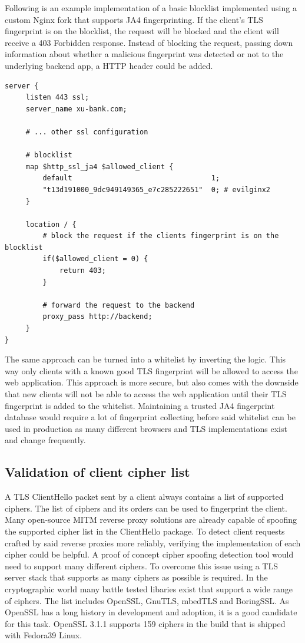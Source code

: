 \documentclass[12pt]{scrbook}
\begin{document}
Following is an example implementation of a basic blocklist implemented using a
custom Nginx
fork that supports JA4 fingerprinting. If the client's TLS fingerprint is on the
blocklist, the request will be blocked and the client will receive a 403
Forbidden response. Instead of blocking the request, passing down information
about whether a malicious fingerprint was detected or not to the underlying
backend app, a HTTP header could be added.

\begin{verbatim}
server {
     listen 443 ssl;
     server_name xu-bank.com;

     # ... other ssl configuration

     # blocklist
     map $http_ssl_ja4 $allowed_client {
         default                                 1;
         "t13d191000_9dc949149365_e7c285222651"  0; # evilginx2
     }

     location / {
         # block the request if the clients fingerprint is on the blocklist
         if($allowed_client = 0) {
             return 403;
         }

         # forward the request to the backend
         proxy_pass http://backend;
     }
}
\end{verbatim}

The same approach can be turned into a whitelist by inverting the logic. This
way only clients with a known good TLS fingerprint will be allowed to access the
web application. This approach is more secure, but also comes with the downside
that new clients will not be able to access the web application until their TLS
fingerprint is added to the whitelist. Maintaining a trusted JA4 fingerprint
database would require a lot of fingerprint collecting before said whitelist can
be used in production as many different browsers and TLS implementations exist
and change frequently.

\subsection{Validation of client cipher list} A TLS ClientHello packet sent
by a client always contains a list of supported ciphers. The list of ciphers
and its orders can be used to fingerprint the client. Many open-source MITM
reverse proxy solutions are already capable of spoofing the supported cipher
list in the ClientHello package. To detect client requests crafted by said
reverse
proxies more reliably, verifying the implementation of each cipher could be
helpful. A proof of concept cipher spoofing detection tool would need to support many
different ciphers. To overcome this issue using a TLS server stack that
supports as many ciphers as possible is required. In the cryptographic world
many battle tested
libaries exist that support a wide range of ciphers. The list includes OpenSSL,
GnuTLS, mbedTLS and BoringSSL.
As OpenSSL has a long history in development and adoption, it is a good
candidate for this task.
OpenSSL 3.1.1 supports 159 ciphers in the build that is shipped with Fedora39
Linux.
\end{document}
